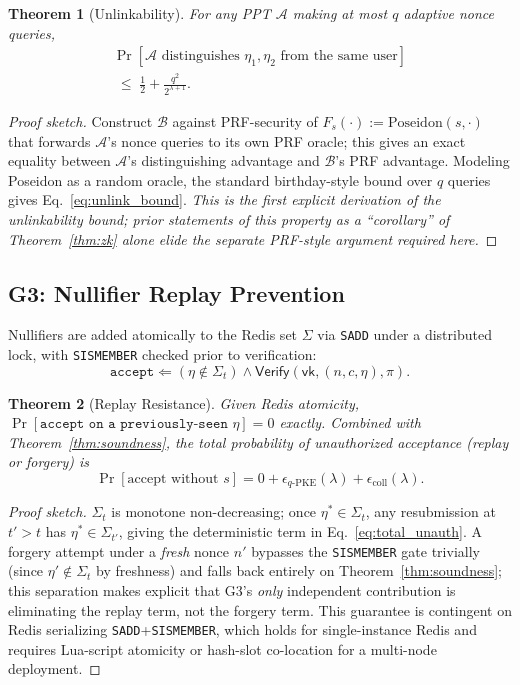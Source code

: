 \documentclass[journal,twoside,10pt]{IEEEtran}
\newtheorem{theorem}{Theorem}
\begin{document}
\begin{theorem}[Unlinkability]
\label{thm:unlink}
For any PPT $\mathcal{A}$ making at most $q$ adaptive nonce queries,
\begin{multline}
\Pr[\mathcal{A}\text{ distinguishes }\eta_1,\eta_2\text{ from the same user}] \\
\;\le\; \tfrac12 + \frac{q^2}{2^{\lambda+1}}.
\label{eq:unlink_bound}
\end{multline}
\end{theorem}
\begin{proof}[Proof sketch]
Construct $\mathcal{B}$ against PRF-security of $F_s(\cdot):=\mathrm{Poseidon}(s,\cdot)$
that forwards $\mathcal{A}$'s nonce queries to its own PRF oracle; this
gives an exact equality between $\mathcal{A}$'s distinguishing advantage
and $\mathcal{B}$'s PRF advantage. Modeling Poseidon as a random oracle,
the standard birthday-style bound over $q$ queries gives
Eq.~\ref{eq:unlink_bound}. \textit{This is the first explicit derivation
of the unlinkability bound; prior statements of this property as a
``corollary'' of Theorem~\ref{thm:zk} alone elide the separate PRF-style
argument required here.}
\end{proof}

\subsection{G3: Nullifier Replay Prevention}
Nullifiers are added atomically to the Redis set $\Sigma$ via \texttt{SADD}
under a distributed lock, with \texttt{SISMEMBER} checked prior to
verification:
\begin{equation}
\texttt{accept} \Leftarrow (\eta\notin\Sigma_t) \wedge \mathsf{Verify}(\mathsf{vk},(n,c,\eta),\pi).
\label{eq:nullifier_gate}
\end{equation}
\begin{theorem}[Replay Resistance]
\label{thm:replay}
Given Redis atomicity, $\Pr[\texttt{accept on a previously-seen }\eta]=0$
exactly. Combined with Theorem~\ref{thm:soundness}, the total probability
of unauthorized acceptance (replay or forgery) is
\begin{equation}
\Pr[\text{accept without }s] = 0 + \epsilon_{q\text{-PKE}}(\lambda) + \epsilon_{\mathrm{coll}}(\lambda).
\label{eq:total_unauth}
\end{equation}
\end{theorem}
\begin{proof}[Proof sketch]
$\Sigma_t$ is monotone non-decreasing; once $\eta^*\in\Sigma_t$, any
resubmission at $t'>t$ has $\eta^*\in\Sigma_{t'}$, giving the deterministic
term in Eq.~\ref{eq:total_unauth}. A forgery attempt under a \emph{fresh}
nonce $n'$ bypasses the \texttt{SISMEMBER} gate trivially (since
$\eta'\notin\Sigma_t$ by freshness) and falls back entirely on
Theorem~\ref{thm:soundness}; this separation makes explicit that G3's
\emph{only} independent contribution is eliminating the replay term, not
the forgery term. This guarantee is contingent on Redis serializing
\texttt{SADD}+\texttt{SISMEMBER}, which holds for single-instance Redis
and requires Lua-script atomicity or hash-slot co-location for a
multi-node deployment.
\end{proof}
\end{document}
